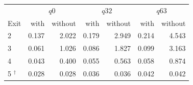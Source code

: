 \begin{tabular}{lrrrrrr}
\toprule
& \multicolumn{2}{c}{$q0$} & \multicolumn{2}{c}{$q32$} & \multicolumn{2}{c}{$q63$} \\
Exit & with & without & with & without & with & without \\
\midrule
2 & 0.137 & 2.022 & 0.179 & 2.949 & 0.214 & 4.543 \\
3 & 0.061 & 1.026 & 0.086 & 1.827 & 0.099 & 3.163 \\
4 & 0.043 & 0.400 & 0.055 & 0.563 & 0.058 & 0.874 \\
5 $^{\dagger}$ & 0.028 & 0.028 & 0.036 & 0.036 & 0.042 & 0.042 \\
\bottomrule
\end{tabular}

